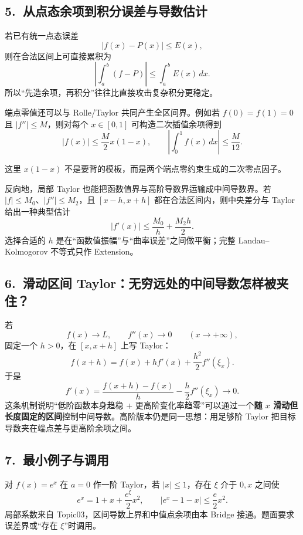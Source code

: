 \documentclass[UTF8,a4paper,10pt]{ctexart}
\begin{document}
\subsection*{5.\ 从点态余项到积分误差与导数估计}
若已有统一点态误差
\[
\lvert f(x)-P(x)\rvert\le E(x),
\]
则在合法区间上可直接累积为
\[
\left\lvert\int_a^b(f-P)\right\rvert\le\int_a^b E(x)\,dx.
\]
所以“先造余项，再积分”往往比直接攻击复杂积分更稳定。

端点零值还可以与 Rolle/Taylor 共同产生全区间界。例如若 $f(0)=f(1)=0$ 且 $\lvert f''\rvert\le M$，则对每个 $x\in[0,1]$ 可构造二次插值余项得到
\[
\lvert f(x)\rvert\le\frac M2x(1-x),
\qquad
\left\lvert\int_0^1f(x)\,dx\right\rvert\le\frac M{12}.
\]

\begin{center}

\end{center}

这里 $x(1-x)$ 不是要背的模板，而是两个端点零约束生成的二次零点因子。

反向地，局部 Taylor 也能把函数值界与高阶导数界运输成中间导数界。若 $\lvert f\rvert\le M_0$、$\lvert f''\rvert\le M_2$，且 $[x-h,x+h]$ 都在合法区间内，则中央差分与 Taylor 给出一种典型估计
\[
\lvert f'(x)\rvert\le \frac{M_0}{h}+\frac{M_2h}{2}.
\]
选择合适的 $h$ 是在“函数值振幅”与“曲率误差”之间做平衡；完整 Landau--Kolmogorov 不等式只作 Extension。

\subsection*{6.\ 滑动区间 Taylor：无穷远处的中间导数怎样被夹住？}
若
\[
f(x)\to L,\qquad f''(x)\to0\qquad(x\to+\infty),
\]
固定一个 $h>0$，在 $[x,x+h]$ 上写 Taylor：
\[
f(x+h)=f(x)+hf'(x)+\frac{h^2}{2}f''(\xi_x).
\]
于是
\[
f'(x)=\frac{f(x+h)-f(x)}h-\frac h2f''(\xi_x)\to0.
\]
这条机制说明“低阶函数本身趋稳 + 更高阶变化率趋零”可以通过一个\textbf{随 $x$ 滑动但长度固定的区间}控制中间导数。高阶版本仍是同一思想：用足够阶 Taylor 把目标导数夹在端点差与更高阶余项之间。

\subsection*{7.\ 最小例子与调用}
对 $f(x)=e^x$ 在 $a=0$ 作一阶 Taylor，若 $\lvert x\rvert\le1$，存在 $\xi$ 介于 $0,x$ 之间使
\[
e^x=1+x+\frac{e^\xi}{2}x^2,\qquad
\lvert e^x-1-x\rvert\le\frac e2x^2.
\]
局部系数来自 Topic03，区间导数上界和中值点余项由本 Bridge 接通。题面要求误差界或“存在 $\xi$”时调用。
\end{document}

